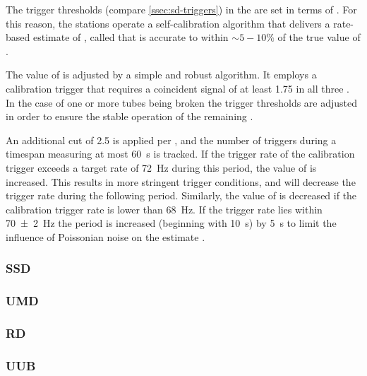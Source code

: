 The trigger thresholds (compare \cref{ssec:sd-triggers}) in the \WCD are set in
terms of \Ivem. For this reason, the stations operate a self-calibration
algorithm that delivers a rate-based estimate of \Ivem, called \VemOnline that 
is accurate to within $\sim5-10\%$ \cite{bertouCalibrationSurfaceArray2006} of 
the true value of \Ivem.

The value of \VemOnline is adjusted by a simple and robust algorithm. It employs
a calibration trigger that requires a coincident signal of at least 
\SI{1.75}{\VemOnline} in all three \LPMTs. In the case of one or more tubes
being broken the trigger thresholds are adjusted in order to ensure the stable 
operation of the remaining \PMTs 
\cite{convengaLocalStationCalibrationDummies2023}.

An additional cut of \SI{2.5}{\VemOnline} is applied per \LPMT, and the number 
of triggers during a timespan measuring at most \SI{60}{\second} is tracked. If
the trigger rate of the calibration trigger exceeds a target rate of 
\SI{72}{\hertz} during this period, the value of \VemOnline is increased. This 
results in more stringent trigger conditions, and will decrease the trigger rate
during the following \DAQ period. Similarly, the value of \VemOnline is 
decreased if the calibration trigger rate is lower than \SI{68}{\hertz}. If the 
trigger rate lies within \SI{70\pm2}{\hertz} the \DAQ period is increased 
(beginning with \SI{10}{\second}) by \SI{5}{\second} to limit the influence of 
Poissonian noise on the estimate \cite{bertouCalibrationSurfaceArray2006, 
convengaLocalStationCalibrationDummies2023}.

\subsubsection{\acf{SSD}}

\subsubsection{\acf{UMD}}

\subsubsection{\acf{RD}}










\subsubsection{\acf{UUB}}

